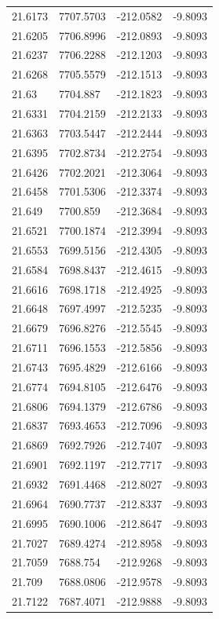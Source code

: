 \begin{table}[H]
\begin{tabular}{llll}
21.6173 & 7707.5703 & -212.0582 & -9.8093 \\
21.6205 & 7706.8996 & -212.0893 & -9.8093 \\
21.6237 & 7706.2288 & -212.1203 & -9.8093 \\
21.6268 & 7705.5579 & -212.1513 & -9.8093 \\
21.63 & 7704.887 & -212.1823 & -9.8093 \\
21.6331 & 7704.2159 & -212.2133 & -9.8093 \\
21.6363 & 7703.5447 & -212.2444 & -9.8093 \\
21.6395 & 7702.8734 & -212.2754 & -9.8093 \\
21.6426 & 7702.2021 & -212.3064 & -9.8093 \\
21.6458 & 7701.5306 & -212.3374 & -9.8093 \\
21.649 & 7700.859 & -212.3684 & -9.8093 \\
21.6521 & 7700.1874 & -212.3994 & -9.8093 \\
21.6553 & 7699.5156 & -212.4305 & -9.8093 \\
21.6584 & 7698.8437 & -212.4615 & -9.8093 \\
21.6616 & 7698.1718 & -212.4925 & -9.8093 \\
21.6648 & 7697.4997 & -212.5235 & -9.8093 \\
21.6679 & 7696.8276 & -212.5545 & -9.8093 \\
21.6711 & 7696.1553 & -212.5856 & -9.8093 \\
21.6743 & 7695.4829 & -212.6166 & -9.8093 \\
21.6774 & 7694.8105 & -212.6476 & -9.8093 \\
21.6806 & 7694.1379 & -212.6786 & -9.8093 \\
21.6837 & 7693.4653 & -212.7096 & -9.8093 \\
21.6869 & 7692.7926 & -212.7407 & -9.8093 \\
21.6901 & 7692.1197 & -212.7717 & -9.8093 \\
21.6932 & 7691.4468 & -212.8027 & -9.8093 \\
21.6964 & 7690.7737 & -212.8337 & -9.8093 \\
21.6995 & 7690.1006 & -212.8647 & -9.8093 \\
21.7027 & 7689.4274 & -212.8958 & -9.8093 \\
21.7059 & 7688.754 & -212.9268 & -9.8093 \\
21.709 & 7688.0806 & -212.9578 & -9.8093 \\
21.7122 & 7687.4071 & -212.9888 & -9.8093 \\

\end{tabular}
\end{table}
